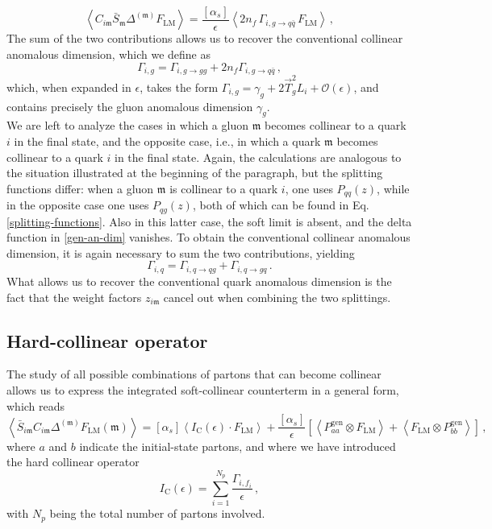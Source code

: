 \documentclass[a4paper, 12pt]{book}
\newcommand{\um}{\mathfrak{m}}
\begin{document}
\begin{equation}
  \left<  C_{i\um} \bar{S}_{\um} \Delta^{(\um)} F_{\mathrm{LM}}\right> = \frac{[\alpha_s]}{\epsilon} \left< 2n_f \, \Gamma_{i,g \to q \bar{q}} \, F_{\mathrm{LM}}\right> \, ,
\end{equation}
The sum of the two contributions allows us to recover the conventional collinear anomalous dimension, which we define as
\begin{equation}
  \Gamma_{i,g} = \Gamma_{i,g \to gg} + 2n_f \Gamma_{i,g \to q \bar{q}} \, ,
\end{equation}
which, when expanded in $\epsilon$, takes the form $\Gamma_{i,g}=\gamma_g + 2 \vec{T}_g^2 L_i + \mathcal{O}(\epsilon)$, and contains precisely the gluon anomalous dimension $\gamma_g$. \\

We are left to analyze the cases in which a gluon $\um$ becomes collinear to a quark $i$ in the final state, and the opposite case, i.e., in which a quark $\um$ becomes collinear to a quark $i$ in the final state. Again, the calculations are analogous to the situation illustrated at the beginning of the paragraph, but the splitting functions differ: when a gluon $\um$ is collinear to a quark $i$, one uses $P_{qq}(z)$, while in the opposite case one uses $P_{qg}(z)$, both of which can be found in Eq. \ref{splitting-functions}. Also in this latter case, the soft limit is absent, and the delta function in \ref{gen-an-dim} vanishes. To obtain the conventional collinear anomalous dimension, it is again necessary to sum the two contributions, yielding
\begin{equation}
  \Gamma_{i,q} = \Gamma_{i,q \to qg} + \Gamma_{i,q \to gq} \,.
\end{equation}
What allows us to recover the conventional quark anomalous dimension is the fact that the weight factors $z_{i\um}$ cancel out when combining the two splittings.


\subsection{Hard-collinear operator}
The study of all possible combinations of partons that can become collinear allows us to express the integrated soft-collinear counterterm in a general form, which reads
\begin{equation}
  \left< \bar{S}_{i\um} C_{i\um} \Delta^{(\um)} F_{\mathrm{LM}}(\um)\right> = [\alpha_s] \left< I_{\mathrm{C}}(\epsilon) \cdot F_{\mathrm{LM}} \right> + \frac{[\alpha_s]}{\epsilon} \left[\left< P_{aa}^{\mathrm{gen}} \otimes F_{\mathrm{LM}} \right> + \left< F_{\mathrm{LM}} \otimes P_{bb}^{\mathrm{gen}}  \right>\right] \, , 
\end{equation}
where $a$ and $b$  indicate the initial-state partons, and where we have introduced the hard collinear operator
\begin{equation}
  I_{\mathrm{C}}(\epsilon) = \sum_{i=1}^{N_p} \frac{\Gamma_{i,f_i}}{\epsilon}  \, ,
\end{equation}
with $N_p$  being the total number of partons involved.
\end{document}
